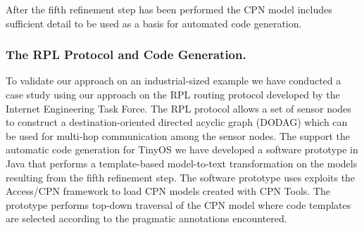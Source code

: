\documentclass{llncs}
\begin{document}
\noindent
After the fifth refinement step has been performed the CPN model
includes sufficient detail to be used as a basis for automated code
generation.
 
\subsubsection{The RPL Protocol and Code Generation.}

To validate our approach on an industrial-sized example we have
conducted a case study using our approach on the RPL routing protocol
\cite{rplprotocol} developed by the Internet Engineering Task
Force. The RPL protocol allows a set of sensor nodes to construct a
destination-oriented directed acyclic graph (DODAG) which can be used
for multi-hop communication among the sensor nodes.  The support the
automatic code generation for TinyOS we have developed a software
prototype in Java that performs a template-based model-to-text
transformation on the models resulting from the fifth refinement
step. The software prototype uses exploits the Access/CPN framework
\cite{accesscpn} to load CPN models created with CPN Tools. The
prototype performs top-down traversal of the CPN model where code
templates are selected according to the pragmatic annotations
encountered.





\end{document}

